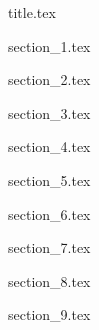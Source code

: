 \documentclass[11pt, a4paper, oneside, onecolumn, titlepage]{article}
\begin{document}
{title.tex}
\tableofcontents

\pagebreak
\listoftables

\pagebreak
\listoffigures

\pagebreak
\listoflistings

\pagebreak
{section_1.tex}

\pagebreak
{section_2.tex}

\pagebreak
{section_3.tex}

\pagebreak
{section_4.tex}

\pagebreak
{section_5.tex}

\pagebreak
{section_6.tex}

\pagebreak
{section_7.tex}

\pagebreak
{section_8.tex}

\pagebreak
{section_9.tex}

\end{document}
